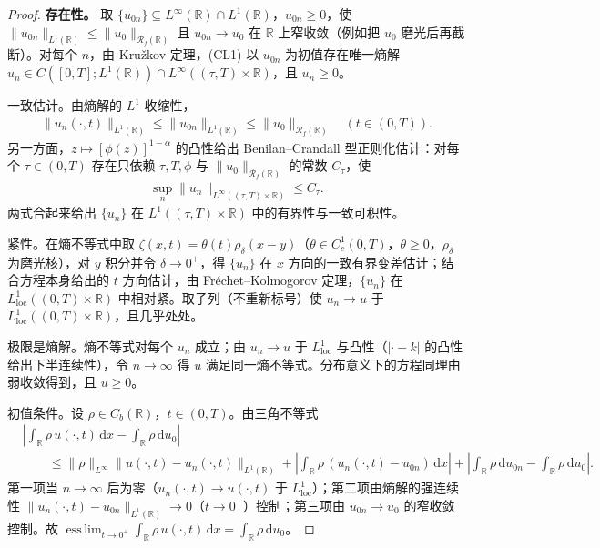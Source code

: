 \documentclass[../main.tex]{subfiles}
\begin{document}
\begin{proof}
\textbf{存在性。} 取 $\{u_{0n}\}\subseteq L^\infty(\mathbb{R})\cap L^1(\mathbb{R})$，$u_{0n}\geqslant0$，使 $\|u_{0n}\|_{L^1(\mathbb{R})}\leqslant\|u_0\|_{\mathscr{R}_f(\mathbb{R})}$ 且 $u_{0n}\to u_0$ 在 $\mathbb{R}$ 上窄收敛（例如把 $u_0$ 磨光后再截断）。对每个 $n$，由 Kružkov 定理，(CL1) 以 $u_{0n}$ 为初值存在唯一熵解 $u_n\in C([0,T];L^1(\mathbb{R}))\cap L^\infty((\tau,T)\times\mathbb{R})$，且 $u_n\geqslant0$。

一致估计。由熵解的 $L^1$ 收缩性，
\begin{align*}
\|u_n(\cdot,t)\|_{L^1(\mathbb{R})}\leqslant\|u_{0n}\|_{L^1(\mathbb{R})}\leqslant\|u_0\|_{\mathscr{R}_f(\mathbb{R})}
\quad (t\in(0,T)).
\end{align*}
另一方面，$z\mapsto[\phi(z)]^{1-\alpha}$ 的凸性给出 Benilan--Crandall 型正则化估计：对每个 $\tau\in(0,T)$ 存在只依赖 $\tau,T,\phi$ 与 $\|u_0\|_{\mathscr{R}_f(\mathbb{R})}$ 的常数 $C_\tau$，使
\begin{align*}
\sup_n\|u_n\|_{L^\infty((\tau,T)\times\mathbb{R})}\leqslant C_\tau .
\end{align*}
两式合起来给出 $\{u_n\}$ 在 $L^1((\tau,T)\times\mathbb{R})$ 中的有界性与一致可积性。

紧性。在熵不等式中取 $\zeta(x,t)=\theta(t)\rho_\delta(x-y)$（$\theta\in C^1_c(0,T)$，$\theta\geqslant0$，$\rho_\delta$ 为磨光核），对 $y$ 积分并令 $\delta\to0^+$，得 $\{u_n\}$ 在 $x$ 方向的一致有界变差估计；结合方程本身给出的 $t$ 方向估计，由 Fréchet--Kolmogorov 定理，$\{u_n\}$ 在 $L^1_{\mathrm{loc}}((0,T)\times\mathbb{R})$ 中相对紧。取子列（不重新标号）使 $u_n\to u$ 于 $L^1_{\mathrm{loc}}((0,T)\times\mathbb{R})$，且几乎处处。

极限是熵解。熵不等式对每个 $u_n$ 成立；由 $u_n\to u$ 于 $L^1_{\mathrm{loc}}$ 与凸性（$|\cdot-k|$ 的凸性给出下半连续性），令 $n\to\infty$ 得 $u$ 满足同一熵不等式。分布意义下的方程同理由弱收敛得到，且 $u\geqslant0$。

初值条件。设 $\rho\in C_b(\mathbb{R})$，$t\in(0,T)$。由三角不等式
\begin{align*}
&\left|\int_{\mathbb{R}}\rho\,u(\cdot,t)\,\mathrm{d}x-\int_{\mathbb{R}}\rho\,\mathrm{d}u_0\right|\\
&\qquad\leqslant\|\rho\|_{L^\infty}\|u(\cdot,t)-u_n(\cdot,t)\|_{L^1(\mathbb{R})}
+\left|\int_{\mathbb{R}}\rho\,(u_n(\cdot,t)-u_{0n})\,\mathrm{d}x\right|
+\left|\int_{\mathbb{R}}\rho\,\mathrm{d}u_{0n}-\int_{\mathbb{R}}\rho\,\mathrm{d}u_0\right| .
\end{align*}
第一项当 $n\to\infty$ 后为零（$u_n(\cdot,t)\to u(\cdot,t)$ 于 $L^1_{\mathrm{loc}}$）；第二项由熵解的强连续性 $\|u_n(\cdot,t)-u_{0n}\|_{L^1(\mathbb{R})}\to0$（$t\to0^+$）控制；第三项由 $u_{0n}\to u_0$ 的窄收敛控制。故 $\operatorname*{ess\,lim}_{t\to0^+}\int_{\mathbb{R}}\rho\,u(\cdot,t)\,\mathrm{d}x=\int_{\mathbb{R}}\rho\,\mathrm{d}u_0$。


\end{proof}
\end{document}
